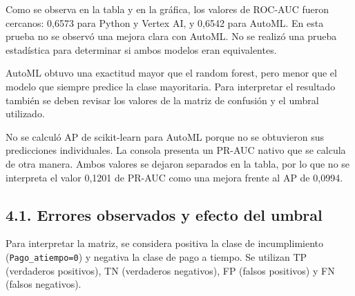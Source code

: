 
\FloatBarrier

Como se observa en la tabla y en la gráfica, los valores de ROC-AUC fueron cercanos: 0,6573 para Python y Vertex AI, y 0,6542 para AutoML. En esta prueba no se observó una mejora clara con AutoML. No se realizó una prueba estadística para determinar si ambos modelos eran equivalentes.


AutoML obtuvo una exactitud mayor que el random forest, pero menor que el modelo que siempre predice la clase mayoritaria. Para interpretar el resultado también se deben revisar los valores de la matriz de confusión y el umbral utilizado.


No se calculó AP de scikit-learn para AutoML porque no se obtuvieron sus predicciones individuales. La consola presenta un PR-AUC nativo que se calcula de otra manera. Ambos valores se dejaron separados en la tabla, por lo que no se interpreta el valor 0,1201 de PR-AUC como una mejora frente al AP de 0,0994.


\FloatBarrier


\subsection{4.1. Errores observados y efecto del umbral}

Para interpretar la matriz, se considera positiva la clase de incumplimiento (\nolinkurl{Pago_atiempo=0}) y negativa la clase de pago a tiempo. Se utilizan TP (verdaderos positivos), TN (verdaderos negativos), FP (falsos positivos) y FN (falsos negativos).


